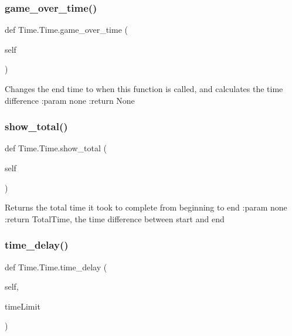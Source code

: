 \subsubsection{\texorpdfstring{game\+\_\+over\+\_\+time()}{game\_over\_time()}}
{\footnotesize\ttfamily def Time.\+Time.\+game\+\_\+over\+\_\+time (\begin{DoxyParamCaption}\item[{}]{self }\end{DoxyParamCaption})}

\begin{DoxyVerb}Changes the end time to when this function is called, and calculates the time difference
:param none
:return None
\end{DoxyVerb}
 \mbox{\label{class_time_1_1_time_aaf3b423ec6a81c3737a01b89e76051b0}} 
\subsubsection{\texorpdfstring{show\+\_\+total()}{show\_total()}}
{\footnotesize\ttfamily def Time.\+Time.\+show\+\_\+total (\begin{DoxyParamCaption}\item[{}]{self }\end{DoxyParamCaption})}

\begin{DoxyVerb}Returns the total time it took to complete from beginning to end
:param none
:return TotalTime, the time difference between start and end
\end{DoxyVerb}
 \mbox{\label{class_time_1_1_time_ae284d02dadb90298689d4711a8c6f992}} 
\subsubsection{\texorpdfstring{time\+\_\+delay()}{time\_delay()}}
{\footnotesize\ttfamily def Time.\+Time.\+time\+\_\+delay (\begin{DoxyParamCaption}\item[{}]{self,  }\item[{}]{time\+Limit }\end{DoxyParamCaption})}

